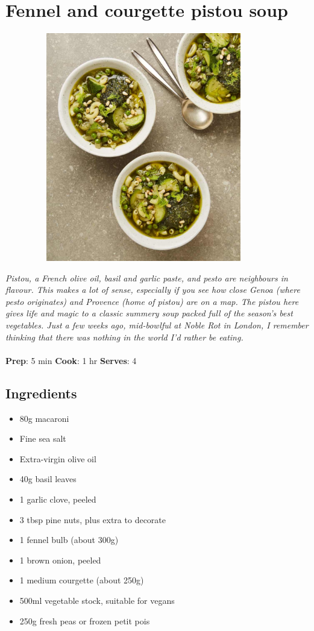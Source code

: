 \documentclass{book}
\begin{document}
\section{Fennel and courgette pistou soup}
\begin{figure}
\centering\includegraphics[width=10cm,height=10cm,keepaspectratio]{Recipe_Pictures/Fennel_and_courgette_pistou_soup.png}
\end{figure}
\emph{Pistou, a French olive oil, basil and garlic paste, and pesto are neighbours in flavour. This makes a lot of sense, especially if you see how close Genoa (where pesto originates) and Provence (home of pistou) are on a map. The pistou here gives life and magic to a classic summery soup packed full of the season’s best vegetables. Just a few weeks ago, mid-bowlful at Noble Rot in London, I remember thinking that there was nothing in the world I’d rather be eating.}\\\\ 
\textbf{Prep}: 5 min
\textbf{Cook}: 1 hr
\textbf{Serves}: 4
\subsection*{Ingredients}
\begin{itemize}
\item 80g macaroni
\item Fine sea salt
\item Extra-virgin olive oil
\item 40g basil leaves
\item 1 garlic clove, peeled
\item 3 tbsp pine nuts, plus extra to decorate
\item 1 fennel bulb (about 300g)
\item 1 brown onion, peeled
\item 1 medium courgette (about 250g)
\item 500ml vegetable stock, suitable for vegans
\item 250g fresh peas or frozen petit pois
\end{itemize}
\end{document}
